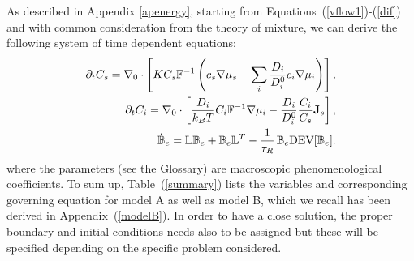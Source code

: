 As described in Appendix \ref{apenergy}, starting from Equations~(\ref{vflow1})-(\ref{dif}) and with common consideration from the theory of mixture, we can derive the following system of time dependent equations:
\begin{eqnarray}
\partial_t C_s=\nabla_0 \cdot\left[K C_s \mathbb{F}^{-1}\left(c_s\nabla \mu_s +\sum_i \frac{D_i}{D^0_i} c_i \nabla \mu_i\right)\right],\label{gov2}\\
\partial_t C_i= \nabla_0\cdot\left[\frac{D_i}{k_B T}C_i\mathbb{F}^{-1}\nabla \mu_i -\frac{D_i}{D^0_i} \frac{C_i}{C_s} \mathbf{J}_s\right],\label{gov3} \\
\dot{\mathbb{B}}_e =\mathbb{L}\mathbb{B}_e + \mathbb{B}_e \mathbb{L}^T - \frac{1}{\tau_R} \,\mathbb{B}_e\text{DEV}[\mathbb{B}_e].\label{Be}
\end{eqnarray}
where the parameters (see the Glossary) are macroscopic phenomenological coefficients. To sum up, Table~(\ref{summary}) lists the variables and corresponding governing equation for model A as well as model B, which we recall has been derived in Appendix~(\ref{modelB}). In order to have a close solution, the proper boundary and initial conditions needs also to be assigned but these will be specified depending on the specific problem considered.

